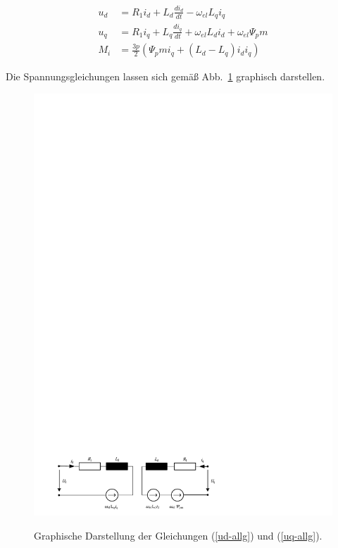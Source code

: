 \documentclass[conference,twocolumn]{IEEEtran}
\begin{document}
\begin{align}
u_d &= R_1 i_d + L_d \frac{di_d}{dt} - \omega_{el}L_q i_q  \label{uq-allg} \\ 
u_q &= R_1 i_q + L_q \frac{di_q}{dt} + \omega_{el}L_d i_d + \omega_{el}\Psi_pm \label{ud-allg} \\ 
M_i &= \frac{3p}{2}(\Psi_pm i_q + (L_d - L_q)i_d i_q)
\end{align}

Die Spannungsgleichungen lassen sich gemäß Abb.~\ref{fig:spannungsgleichungen} graphisch darstellen.

\begin{figure}
\includegraphics[width=\columnwidth]{img/spannungsgleichungen}
\label{fig:spannungsgleichungen}
\caption{Graphische Darstellung der Gleichungen (\ref{ud-allg}) und (\ref{uq-allg}).}
\end{figure}
\end{document}
